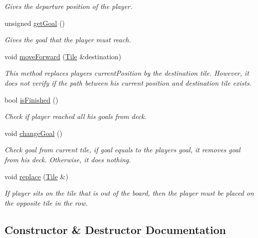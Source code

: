 \begin{DoxyCompactItemize}
\begin{DoxyCompactList}\small\item\em Gives the departure position of the player. \end{DoxyCompactList}\item 
unsigned \mbox{\hyperlink{classPlayer_aae4cea29ac6534922810177b488bdf64}{get\+Goal}} ()
\begin{DoxyCompactList}\small\item\em Gives the goal that the player must reach. \end{DoxyCompactList}\item 
void \mbox{\hyperlink{classPlayer_a6c4732be91110899d5662ca9a1d76e4e}{move\+Forward}} (\mbox{\hyperlink{classTile}{Tile}} \&destination)
\begin{DoxyCompactList}\small\item\em This method replaces player\textquotesingle{}s current\+Position by the destination tile. However, it does not verify if the path between his current position and destination tile exists. \end{DoxyCompactList}\item 
bool \mbox{\hyperlink{classPlayer_addccad6110e3723c735ed69c0239cabe}{is\+Finished}} ()
\begin{DoxyCompactList}\small\item\em Check if player reached all his goals from deck. \end{DoxyCompactList}\item 
void \mbox{\hyperlink{classPlayer_a484b4e7361c5f6eaa4a2bf645e15e745}{change\+Goal}} ()
\begin{DoxyCompactList}\small\item\em Check goal from current tile, if goal equals to the player\textquotesingle{}s goal, it removes goal from his deck. Otherwise, it does nothing. \end{DoxyCompactList}\item 
void \mbox{\hyperlink{classPlayer_ab6b15b5ec31d724bfe33f7888d5d85fa}{replace}} (\mbox{\hyperlink{classTile}{Tile}} \&)
\begin{DoxyCompactList}\small\item\em If player sits on the tile that is out of the board, then the player must be placed on the opposite tile in the row. \end{DoxyCompactList}\end{DoxyCompactItemize}


\subsection{Constructor \& Destructor Documentation}
\mbox{\label{classPlayer_abf29edb717ec5ec6a50ac04aae5906da}} 
